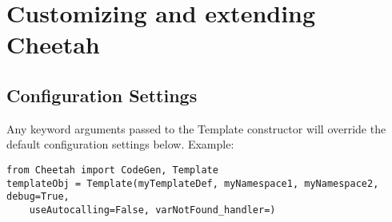 \section{Customizing and extending Cheetah}
\label{customizing}


\subsection{Configuration Settings}

Any keyword arguments passed to the Template constructor will override the
default configuration settings below.  Example:

\begin{verbatim}
from Cheetah import CodeGen, Template
templateObj = Template(myTemplateDef, myNamespace1, myNamespace2, debug=True,
	useAutocalling=False, varNotFound_handler=)
\end{verbatim}

